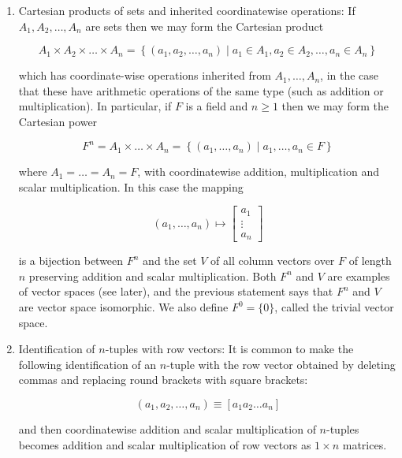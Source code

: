 \documentclass{article}
\begin{document}
    \begin{enumerate}
        \item Cartesian products of sets and inherited coordinatewise operations: If $A_{1}, A_{2}, \ldots, A_{n}$ are sets then we may form the Cartesian product

        $$
        A_{1} \times A_{2} \times \ldots \times A_{n}=\left\{\left(a_{1}, a_{2}, \ldots, a_{n}\right) \mid a_{1} \in A_{1}, a_{2} \in A_{2}, \ldots, a_{n} \in A_{n}\right\}
        $$

        which has coordinate-wise operations inherited from $A_{1}, \ldots, A_{n}$, in the case that these have arithmetic operations of the same type (such as addition or multiplication). In particular, if $F$ is a field and $n \geq 1$ then we may form the Cartesian power

        $$
        F^{n}=A_{1} \times \ldots \times A_{n}=\left\{\left(a_{1}, \ldots, a_{n}\right) \mid a_{1}, \ldots, a_{n} \in F\right\}
        $$

        where $A_{1}=\ldots=A_{n}=F$, with coordinatewise addition, multiplication and scalar multiplication. In this case the mapping

        $$
        \left(a_{1}, \ldots, a_{n}\right) \mapsto\left[\begin{array}{c}
        a_{1} \\
        \vdots \\
        a_{n}
        \end{array}\right]
        $$

        is a bijection between $F^{n}$ and the set $V$ of all column vectors over $F$ of length $n$ preserving addition and scalar multiplication. Both $F^{n}$ and $V$ are examples of vector spaces (see later), and the previous statement says that $F^{n}$ and $V$ are vector space isomorphic. We also define $F^{0}=\{0\}$, called the trivial vector space.

        \item Identification of $n$-tuples with row vectors: It is common to make the following identification of an $n$-tuple with the row vector obtained by deleting commas and replacing round brackets with square brackets:

        $$
        \left(a_{1}, a_{2}, \ldots, a_{n}\right) \equiv\left[a_{1} a_{2} \ldots a_{n}\right]
        $$

        and then coordinatewise addition and scalar multiplication of $n$-tuples becomes addition and scalar multiplication of row vectors as $1 \times n$ matrices.


\end{enumerate}
\end{document}
